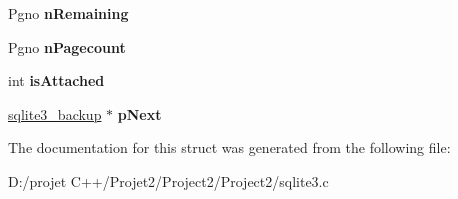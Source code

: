 \begin{DoxyCompactItemize}
Pgno {\bfseries n\+Remaining}
\item 
\mbox{\label{structsqlite3__backup_a98599d5a3a13173a6a126242d1fbbaa8}} 
Pgno {\bfseries n\+Pagecount}
\item 
\mbox{\label{structsqlite3__backup_af515f0d9265847d820cbaad41cef78ae}} 
int {\bfseries is\+Attached}
\item 
\mbox{\label{structsqlite3__backup_a3a87332e045fe4a477fe262409c6011a}} 
\mbox{\hyperlink{structsqlite3__backup}{sqlite3\+\_\+backup}} $\ast$ {\bfseries p\+Next}
\end{DoxyCompactItemize}


The documentation for this struct was generated from the following file\+:\begin{DoxyCompactItemize}
\item 
D\+:/projet C++/\+Projet2/\+Project2/\+Project2/sqlite3.\+c\end{DoxyCompactItemize}
